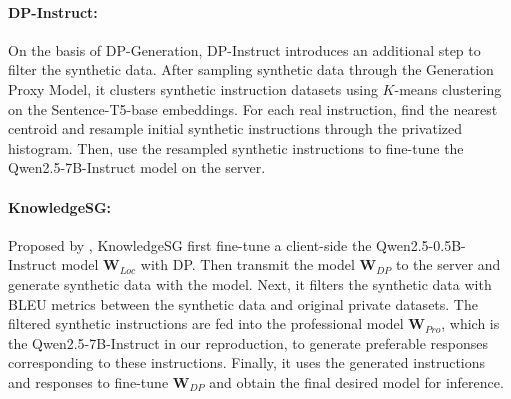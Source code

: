 \paragraph{DP-Instruct:} On the basis of DP-Generation, DP-Instruct \citep{dayu2024privacy} introduces an additional step to filter the synthetic data. 
After sampling synthetic data through the Generation Proxy Model, it clusters synthetic instruction datasets using $K$-means clustering on the Sentence-T5-base \citep{NiT522} embeddings. 
For each real instruction, find the nearest centroid and resample initial synthetic instructions through the privatized histogram. 
Then, use the resampled synthetic instructions to fine-tune the Qwen2.5-7B-Instruct model on the server.


\paragraph{KnowledgeSG:} Proposed by \citet{Wang2024KnowledgeSGPS}, KnowledgeSG first fine-tune a client-side the Qwen2.5-0.5B-Instruct model $\mathbf{W}_{Loc}$ with DP. 
Then transmit the model $\mathbf{W}_{DP}$ to the server and generate synthetic data with the model. 
Next, it filters the synthetic data with BLEU metrics between the synthetic data and original private datasets. 
The filtered synthetic instructions are fed into the professional model $\mathbf{W}_{Pro}$, which is the Qwen2.5-7B-Instruct in our reproduction, to generate preferable responses corresponding to these instructions. 
Finally, it uses the generated instructions and responses to fine-tune $\mathbf{W}_{DP}$ and obtain the final desired model for inference.


